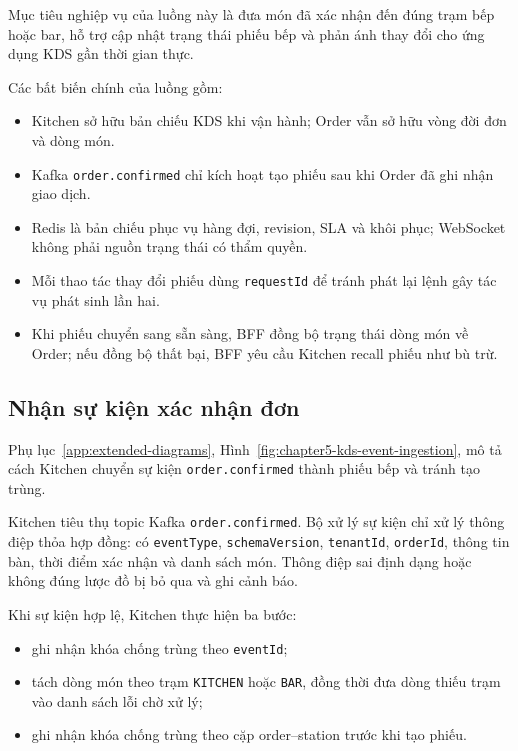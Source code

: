 Mục tiêu nghiệp vụ của luồng này là đưa món đã xác nhận đến đúng trạm bếp hoặc bar, hỗ trợ cập nhật trạng thái phiếu bếp và phản ánh thay đổi cho ứng dụng KDS gần thời gian thực.

Các bất biến chính của luồng gồm:

\begin{itemize}
  \item Kitchen sở hữu bản chiếu KDS khi vận hành; Order vẫn sở hữu vòng đời đơn và dòng món.
  \item Kafka \texttt{order.confirmed} chỉ kích hoạt tạo phiếu sau khi Order đã ghi nhận giao dịch.
  \item Redis là bản chiếu phục vụ hàng đợi, revision, SLA và khôi phục; WebSocket không phải nguồn trạng thái có thẩm quyền.
  \item Mỗi thao tác thay đổi phiếu dùng \texttt{requestId} để tránh phát lại lệnh gây tác vụ phát sinh lần hai.
  \item Khi phiếu chuyển sang sẵn sàng, BFF đồng bộ trạng thái dòng món về Order; nếu đồng bộ thất bại, BFF yêu cầu Kitchen recall phiếu như bù trừ.
\end{itemize}

\subsection{Nhận sự kiện xác nhận đơn}

Phụ lục~\ref{app:extended-diagrams}, Hình~\ref{fig:chapter5-kds-event-ingestion}, mô tả cách Kitchen chuyển sự kiện \texttt{order.confirmed} thành phiếu bếp và tránh tạo trùng.

Kitchen tiêu thụ topic Kafka \texttt{order.confirmed}. Bộ xử lý sự kiện chỉ xử lý thông điệp thỏa hợp đồng: có \texttt{eventType}, \texttt{schemaVersion}, \texttt{tenantId}, \texttt{orderId}, thông tin bàn, thời điểm xác nhận và danh sách món. Thông điệp sai định dạng hoặc không đúng lược đồ bị bỏ qua và ghi cảnh báo.

Khi sự kiện hợp lệ, Kitchen thực hiện ba bước:

\begin{itemize}
  \item ghi nhận khóa chống trùng theo \texttt{eventId};
  \item tách dòng món theo trạm \texttt{KITCHEN} hoặc \texttt{BAR}, đồng thời đưa dòng thiếu trạm vào danh sách lỗi chờ xử lý;
  \item ghi nhận khóa chống trùng theo cặp order--station trước khi tạo phiếu.
\end{itemize}

